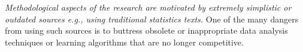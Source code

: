 \documentclass[10pt]{elsarticle}
\begin{document}
{\em Methodological aspects of the research are motivated by extremely simplistic or outdated sources e.g., using traditional statistics texts. }  One of the many dangers from using such sources is to buttress obsolete or inappropriate data analysis techniques or learning algorithms that are no longer competitive.





 
 

% 
\end{document}
